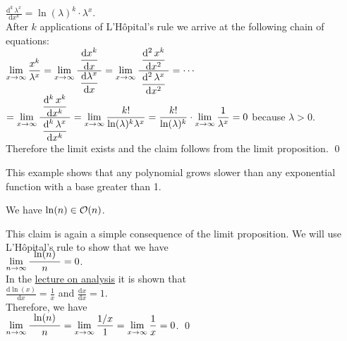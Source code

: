  $\displaystyle \frac{\mathrm{d}^k\,\lambda^{x}}{\mathrm{d}x^k} = \ln(\lambda)^k \cdot \lambda^x$. \\[0.2cm]
After $k$ applications of L'H\^opital's rule we arrive at the following chain of equations:
\\[0.2cm]
\hspace*{1.3cm} 
$\displaystyle 
\lim\limits_{x \rightarrow \infty} \frac{x^{k}}{\lambda^x} =
\lim\limits_{x \rightarrow \infty} \frac{\displaystyle\;\frac{\mathrm{d}x^{k}}{\mathrm{d}x}\;}{\displaystyle\frac{\mathrm{d}\lambda^x}{\mathrm{d}x}} =
\lim\limits_{x \rightarrow \infty} \frac{\displaystyle\;\frac{\mathrm{d}^2\,x^{k}}{\mathrm{d}x^2}\;}{\displaystyle\frac{\mathrm{d}^2\,\lambda^x}{\mathrm{d}x^2}} =
\cdots$
\\[0.3cm]
\hspace*{2.8cm}
$\displaystyle = 
\lim\limits_{x \rightarrow \infty} \frac{\displaystyle\;\frac{\mathrm{d}^k\,x^{k}}{\mathrm{d}x^k}\;}{\displaystyle\frac{\mathrm{d}^k\,\lambda^x}{\mathrm{d}x^k}} =
\lim\limits_{x \rightarrow \infty} \frac{k!}{\ln(\lambda)^k \lambda^x} =
\frac{k!}{\ln(\lambda)^k} \cdot \lim\limits_{x \rightarrow \infty} \frac{1}{\lambda^x} = 0$ \quad because
$\lambda > 0$.
\\[0.2cm] 
Therefore the limit exists and the claim follows from the limit proposition.
\qed

\remark
This example shows that any polynomial grows slower than any exponential function with a base greater than 1.
\eoxs

\example
We have $\ln(n) \in \mathcal{O}(n)$.
\ex

\proof
This claim is again a simple consequence of the limit proposition.  We will use L'H\^opital's rule
to show that we have
\\[0.4cm]
\hspace*{1.3cm} 
$\lim\limits_{n \rightarrow \infty} \bruch{\;\ln(n)\;}{n} = 0$.
\\[0.2cm]
In the \href{https://github.com/karlstroetmann/Analysis/blob/master/Skript/analysis.pdf}{lecture on analysis}
it is shown that \\[0.2cm] 
\hspace*{1.3cm} $\displaystyle \frac{\mathrm{d} \ln(x)}{\mathrm{d}x} = \frac{1}{x}$ 
\quad and \quad
 $\displaystyle \frac{\mathrm{d} x}{\mathrm{d}x} = 1$. \\[0.2cm]
Therefore, we have \\[0.2cm]
\hspace*{1.3cm} 
$\displaystyle \lim\limits_{n \rightarrow \infty} \bruch{\;\ln(n)\;}{n} = 
\lim\limits_{x \rightarrow \infty} \frac{1/x}{1} = 
\lim\limits_{x \rightarrow \infty} \frac{1}{x} = 0$. \qed


